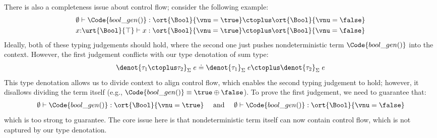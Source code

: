 There is also a completeness issue about control flow; consider the following example:
\begin{align*}
  &\emptyset \vdash \Code{bool\_gen()}: \ort{\Bool}{\vnu = \true} \ctoplus \ort{\Bool}{\vnu = \false}
  \\&x{:}\urt{\Bool}{\top} \vdash x: \ort{\Bool}{\vnu = \true} \ctoplus \ort{\Bool}{\vnu = \false}
\end{align*}\noindent
Ideally, both of these typing judgements should hold, where the second one just pushes nondeterministic term $\Code{bool\_gen()}$ into the context. However, the first judgement conflicts with our type denotation of sum type:
\begin{align*}
  \denot{\tau_1 \ctoplus \tau_2}_\Sigma\;e \doteq \denot{\tau_1}_\Sigma\;e \ctoplus \denot{\tau_2}_\Sigma\;e
\end{align*}\noindent
This type denotation allows us to divide context to align control flow, which enables the second typing judgement to hold; however, it disallows dividing the term itself (e.g., $\Code{bool\_gen()} \equiv \true \oplus \false$). To prove the first judgement, we need to guarantee that:
\begin{align*}
  \emptyset \vdash \Code{bool\_gen()}: \ort{\Bool}{\vnu = \true} \quad \text{ and } \quad \emptyset \vdash \Code{bool\_gen()}: \ort{\Bool}{\vnu = \false}
\end{align*}\noindent
which is too strong to guarantee. The core issue here is that nondeterministic term itself can now contain control flow, which is not captured by our type denotation.

